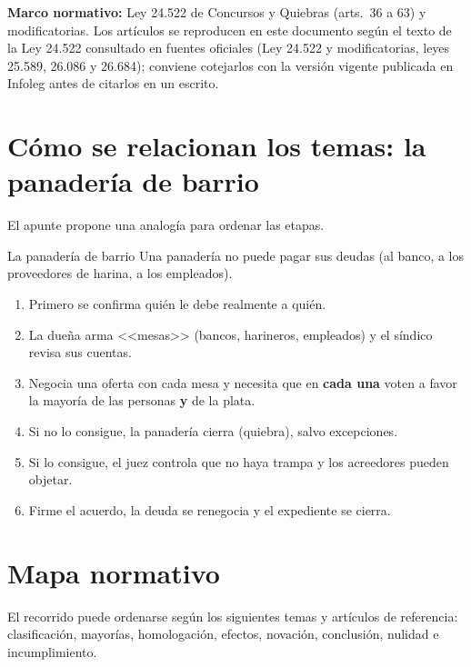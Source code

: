 \documentclass[12pt,oneside]{book}
\begin{document}
\begin{note}
\textbf{Marco normativo:} Ley 24.522 de Concursos y Quiebras (arts.\ 36 a 63) y modificatorias. Los artículos se reproducen en este documento según el texto de la Ley 24.522 consultado en fuentes oficiales (Ley 24.522 y modificatorias, leyes 25.589, 26.086 y 26.684); conviene cotejarlos con la versión vigente publicada en Infoleg antes de citarlos en un escrito.
\end{note}

\section{Cómo se relacionan los temas: la panadería de barrio}

El apunte propone una analogía para ordenar las etapas.

\begin{example}{La panadería de barrio}
Una panadería no puede pagar sus deudas (al banco, a los proveedores de harina, a los empleados).
\begin{enumerate}[label=\textbf{\Alph*.}]
    \item Primero se confirma quién le debe realmente a quién.
    \item La dueña arma <<mesas>> (bancos, harineros, empleados) y el síndico revisa sus cuentas.
    \item Negocia una oferta con cada mesa y necesita que en \textbf{cada una} voten a favor la mayoría de las personas \textbf{y} de la plata.
    \item Si no lo consigue, la panadería cierra (quiebra), salvo excepciones.
    \item Si lo consigue, el juez controla que no haya trampa y los acreedores pueden objetar.
    \item Firme el acuerdo, la deuda se renegocia y el expediente se cierra.
\end{enumerate}
\end{example}

\section{Mapa normativo}

El recorrido puede ordenarse según los siguientes temas y artículos de referencia: clasificación, mayorías, homologación, efectos, novación, conclusión, nulidad e incumplimiento.
\end{document}
